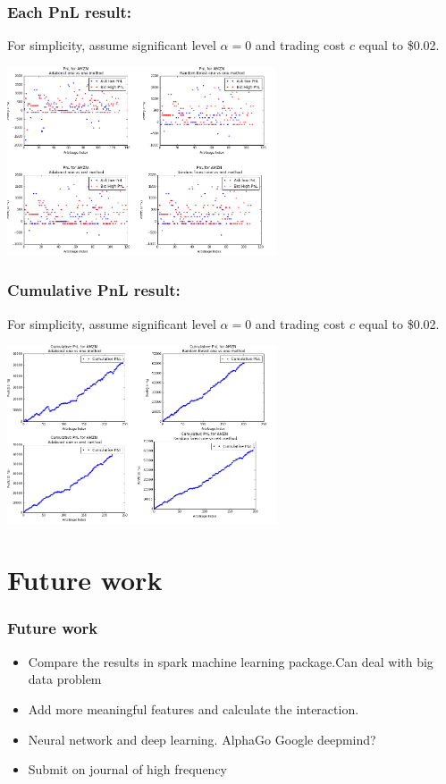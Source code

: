 \documentclass[xcolor={x11names,svgnames,dvipsnames}]{beamer}
\begin{document}
\begin{frame}
\frametitle{Each PnL result:}

For simplicity, assume significant level $\alpha=0$ and trading cost $c$ equal to \$0.02.
\begin{center}
     \includegraphics[width=0.6\textwidth, height=0.6\textheight]{amzn_pnl.png}
\end{center}    

\end{frame}

\begin{frame}
\frametitle{Cumulative PnL result:}

For simplicity, assume significant level $\alpha=0$ and trading cost $c$ equal to \$0.02.
\begin{center}
     \includegraphics[width=0.6\textwidth, height=0.6\textheight]{amzn_cum_pnl.png}
\end{center}    

\end{frame}

\section{Future work}
\begin{frame}
\frametitle{Future work}
    \begin{itemize}
        \item  Compare the results in spark machine learning package.Can deal with big data problem 
        \item  Add more meaningful features and calculate the interaction.
        \item  Neural network and deep learning.  AlphaGo Google deepmind?
        \item  Submit on journal of high frequency 
      \end{itemize}
\end{frame}
\end{document}
